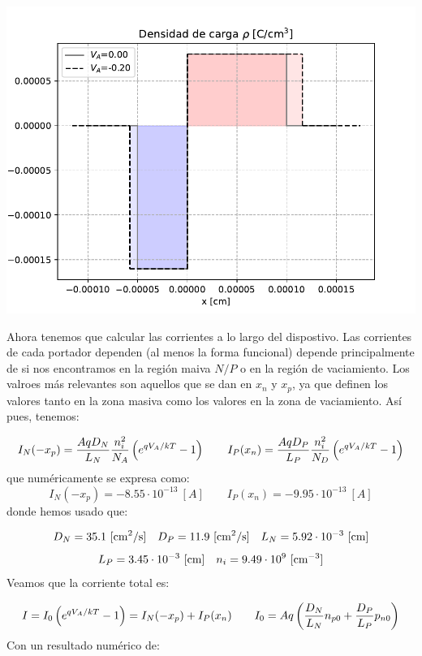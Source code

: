 \begin{enumerate}[label=\alph*)]
\begin{figure}[h!]
\begin{subfigure}{0.47\textwidth}
    \end{subfigure}
    \end{figure}
    \begin{center}
        \includegraphics[width=0.6\linewidth]{Ejercicios/Ch_03/03_06_rho.pdf}
    \end{center}   
    Ahora tenemos que calcular las corrientes a lo largo del dispostivo. Las corrientes de cada portador dependen (al menos la forma funcional) depende principalmente de si nos encontramos en la región maiva $N/P$ o en la región de vaciamiento. 
    Los valroes más relevantes son aquellos que se dan en $x_n$ y $x_p$, ya que definen los valores tanto en la zona masiva como los valores en la zona de vaciamiento. Así pues, tenemos:

    \begin{equation}
        I_N (-x_p) = \frac{AqD_N}{L_N}  \frac{n_i^2}{N_A} \left( e^{qV_A/kT}-1 \right) \qquad
        I_P (x_n) = \frac{AqD_P}{L_P} \frac{n_i^2}{N_D}  \left( e^{qV_A/kT}-1 \right)
    \end{equation}
    que numéricamente se expresa como:
    \begin{equation}
        I_N (-x_p) = -8.55\cdot10^{-13} \ [\unit{A}] \qquad 
        I_P (x_n) = -9.95 \cdot 10^{-13}\ [\unit{A}]
    \end{equation}
    donde hemos usado que:

    \begin{equation}
        D_N = 35.1 \ [\unit{cm^2/s}] \quad 
        D_P = 11.9 \ [\unit{cm^2/s}] \quad L_N = 5.92 \cdot 10^{-3} \ [\cm] \end{equation}
    \begin{equation}     
        L_P = 3.45 \cdot 10^{-3} \ [\cm]  \quad n_i = 9.49 \cdot 10^{9} \ [\cm^{-3}]
    \end{equation}
    Veamos que la corriente total es:    

    \begin{equation}
        I = I_0 \left( e^{qV_A/kT}-1 \right) = I_N (-x_p) + I_P (x_n) \qquad  I_0 =  A q \left( \frac{D_N}{L_N} n_{p0} + \frac{D_P}{L_P} p_{n0} \right)
    \end{equation}
    Con un resultado numérico de: 


\end{enumerate}
